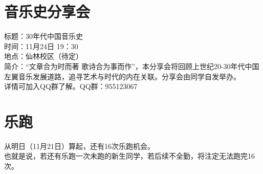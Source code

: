 \documentclass[letterpaper, 12pt]{article}
\begin{document}
\begin{multicols}{2}
\section{音乐史分享会}
标题：30年代中国音乐史\\
时间：11月24日 19：30\\
地点：仙林校区（待定）\\
简介：“文章合为时而著 歌诗合为事而作”，本分享会将回顾上世纪20-30年代中国左翼音乐发展道路，追寻艺术与时代的内在关联。分享会由同学自发举办。\\
详情可加入QQ群了解。QQ群：955123067

\section{乐跑}
从明日（11月21日）算起，还有16次乐跑机会。\\
也就是说，若还有乐跑一次未跑的新生同学，若后续不全勤，将注定无法跑完16次。\\
\end{multicols} 
\end{document}
